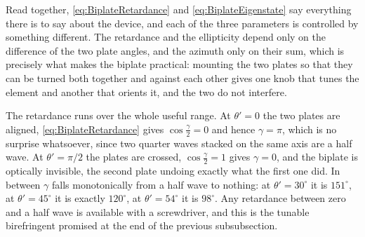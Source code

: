             Read together, \ref{eq:BiplateRetardance} and \ref{eq:BiplateEigenstate} say everything there is to say about the device, and each of the three parameters is controlled by something different. The retardance and the ellipticity depend only on the difference of the two plate angles, and the azimuth only on their sum, which is precisely what makes the biplate practical: mounting the two plates so that they can be turned both together and against each other gives one knob that tunes the element and another that orients it, and the two do not interfere.

            The retardance runs over the whole useful range. At $\theta'=0$ the two plates are aligned, \ref{eq:BiplateRetardance} gives $\cos\frac\gamma2=0$ and hence $\gamma=\pi$, which is no surprise whatsoever, since two quarter waves stacked on the same axis are a half wave. At $\theta'=\pi/2$ the plates are crossed, $\cos\frac{\gamma}{2}=1$ gives $\gamma=0$, and the biplate is optically invisible, the second plate undoing exactly what the first one did. In between $\gamma$ falls monotonically from a half wave to nothing: at $\theta'=30^\circ$ it is $151^\circ$, at $\theta'=45^\circ$ it is exactly $120^\circ$, at $\theta'=54^\circ$ it is $98^\circ$. Any retardance between zero and a half wave is available with a screwdriver, and this is the tunable birefringent promised at the end of the previous subsubsection.

